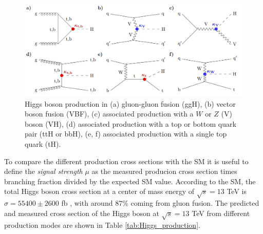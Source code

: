 
\begin{figure}[!ht]
    \vspace*{-0.0cm}
    \centering
    \setlength{\mylength}{\textwidth}
    \includegraphics[width=0.8\mylength]{resources/Higgs_production.png}
    \vspace*{-0.0cm}
    \caption{Higgs boson production in (a) gluon-gluon fusion (ggH), (b) vector boson fusion (VBF), (c)
    associated production with a $W$ or $Z$ (V) boson (VH), (d) associated production with a top or
    bottom quark pair (ttH or bbH), (e, f) associated production with a single top quark (tH).}
    \label{fig:Higgs_production}
    \vspace*{-0.0cm}
\end{figure}


To compare the different production cross sections with the SM it is useful to define the \textit{signal strength} $\mu$ as the measured producion cross section times branching fraction divided by the expected SM value. According to the SM, the total Higgs boson cross section at a center of mass energy of $\sqrt{s} = 13$ TeV is $\sigma = 55400 \pm 2600$ fb \cite{LHCHiggsCrossSectionWorkingGroup:2016ypw}, with around 87\% coming from gluon fusion. The predicted and measured cross section of the Higgs boson at $\sqrt{s} = 13$ TeV from different production modes are shown in Table \ref{tab:Higgs_production}.


